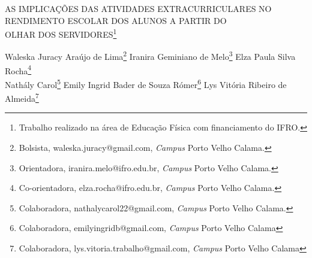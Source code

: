 \documentclass[article,12pt,onesidea,4paper,english,brazil]{abntex2}
\begin{document}
	
	
	\frenchspacing 
	
	\begin{center}
		\LARGE AS IMPLICAÇÕES DAS ATIVIDADES EXTRACURRICULARES NO RENDIMENTO
		ESCOLAR DOS ALUNOS A PARTIR DO\\OLHAR DOS SERVIDORES\footnote{Trabalho realizado na área de Educação Física com financiamento do IFRO.}
		
		\normalsize
		Waleska Juracy Araújo de Lima\footnote{Bolsista, waleska.juracy@gmail.com, \textit{Campus} Porto Velho Calama.} 
		Iranira Geminiano de Melo\footnote{Orientadora, iranira.melo@ifro.edu.br, \textit{Campus} Porto Velho Calama.} 
		Elza Paula Silva Rocha\footnote{Co-orientadora, elza.rocha@ifro.edu.br, \textit{Campus} Porto Velho Calama.} \\
		Nathály Carol\footnote{Colaboradora, nathalycarol22@gmail.com, \textit{Campus} Porto Velho Calama.}
		Emily Ingrid Bader de Souza Rómer\footnote{Colaboradora, emilyingridb@gmail.com, \textit{Campus} Porto Velho Calama}
		Lys Vitória Ribeiro de Almeida\footnote{Colaboradora, lys.vitoria.trabalho@gmail.com, \textit{Campus} Porto Velho Calama} 
	\end{center}
	
\end{document}
